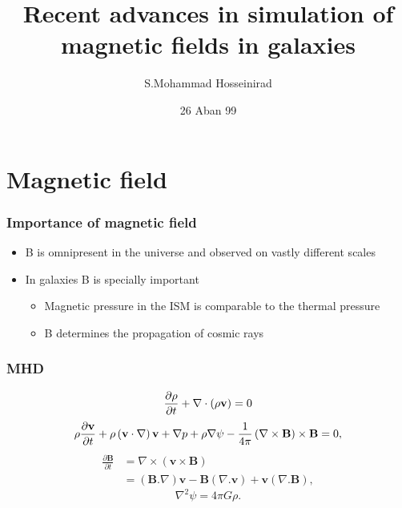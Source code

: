 \documentclass[10pt,aspectratio=169]{beamer}
\title[Recent advances in simulation of B in galaxies]{Recent advances in simulation of magnetic fields in galaxies}
\author[S.Mohammad Hosseinirad]
{S.Mohammad Hosseinirad} %
\institute[IPM]{IPM}
\date{26 Aban 99}
\newcommand{\bvec}[1]{{\bf #1}}
\begin{document}
\begin{frame}
        \titlepage
\end{frame}

\section{Magnetic field}
\begin{frame}
\frametitle{Importance of magnetic field}
\begin{itemize}%
  \item B is omnipresent in the universe and observed on vastly different scales
  \item In galaxies B is specially important
  \begin{itemize}
  	\item Magnetic pressure in the ISM is comparable to the thermal pressure
  	\item B determines the propagation of cosmic rays
  \end{itemize}
\end{itemize}
\end{frame}
\begin{frame}
\frametitle{MHD}
	\begin{align}
		\frac{\partial \rho}{\partial t} + \nabla\cdot\left(\rho\bvec{v}\right) = 0
	\end{align}
	\begin{align}
		\rho\frac{\partial \mathbf{v}}{\partial t} + \rho\left(\bvec{v}\cdot\nabla\right) \bvec{v}
		+ \nabla p + \rho\nabla\psi
		- \dfrac{1}{4\pi}\left(\nabla\times\bvec{B}\right)\times\bvec{B} = 0,
	\end{align}
	\begin{align}
		\frac{\partial \mathbf{B}}{\partial t} &= \nabla \times \left( \mathbf{v} \times \mathbf{B} \right) \\
		&= (\mathbf{B} . \nabla) \mathbf{v} - \mathbf{B}(\nabla . \mathbf{v}) + \mathbf{v}(\nabla . \mathbf{B}),
	\end{align}
	\begin{equation}
		\nabla^{2}\psi = 4\pi G \rho.
	\end{equation}
\end{frame}
\end{document}
